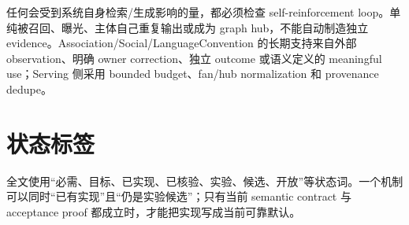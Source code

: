 任何会受到系统自身检索/生成影响的量，都必须检查 self-reinforcement loop。单纯被召回、曝光、主体自己重复输出或成为 graph hub，不能自动制造独立 evidence。Association/Social/LanguageConvention 的长期支持来自外部 observation、明确 owner correction、独立 outcome 或语义定义的 meaningful use；Serving 侧采用 bounded budget、fan/hub normalization 和 provenance dedupe。

\section{状态标签}

全文使用“必需、目标、已实现、已核验、实验、候选、开放”等状态词。一个机制可以同时“已有实现”且“仍是实验候选”；只有当前 semantic contract 与 acceptance proof 都成立时，才能把实现写成当前可靠默认。
